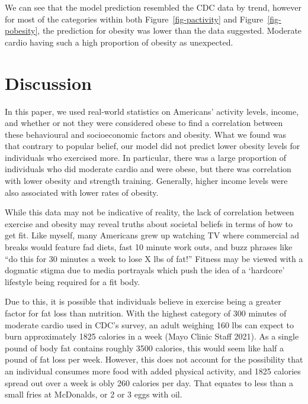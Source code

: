 \documentclass[
  letterpaper,
  DIV=11,
  numbers=noendperiod]{scrartcl}
\begin{document}
We can see that the model prediction resembled the CDC data by trend,
however for most of the categories within both
Figure~\ref{fig-pactivity} and Figure~\ref{fig-pobesity}, the prediction
for obesity was lower than the data suggested. Moderate cardio having
such a high proportion of obesity as unexpected.

\hypertarget{discussion}{%
\section{Discussion}\label{discussion}}

In this paper, we used real-world statistics on Americans' activity
levels, income, and whether or not they were considered obese to find a
correlation between these behavioural and socioeconomic factors and
obesity. What we found was that contrary to popular belief, our model
did not predict lower obesity levels for individuals who exercised more.
In particular, there was a large proportion of individuals who did
moderate cardio and were obese, but there was correlation with lower
obesity and strength training. Generally, higher income levels were also
associated with lower rates of obesity.

While this data may not be indicative of reality, the lack of
correlation between exercise and obesity may reveal truths about
societal beliefs in terms of how to get fit. Like myself, many Americans
grew up watching TV where commercial ad breaks would feature fad diets,
fast 10 minute work outs, and buzz phrases like ``do this for 30 minutes
a week to lose X lbs of fat!'' Fitness may be viewed with a dogmatic
stigma due to media portrayals which push the idea of a `hardcore'
lifestyle being required for a fit body.

Due to this, it is possible that individuals believe in exercise being a
greater factor for fat loss than nutrition. With the highest category of
300 minutes of moderate cardio used in CDC's survey, an adult weighing
160 lbs can expect to burn approximately 1825 calories in a week (Mayo
Clinic Staff 2021). As a single pound of body fat contains roughly 3500
calories, this would seem like half a pound of fat loss per week.
However, this does not account for the possibility that an individual
consumes more food with added physical activity, and 1825 calories
spread out over a week is obly 260 calories per day. That equates to
less than a small fries at McDonalds, or 2 or 3 eggs with oil.
\end{document}
